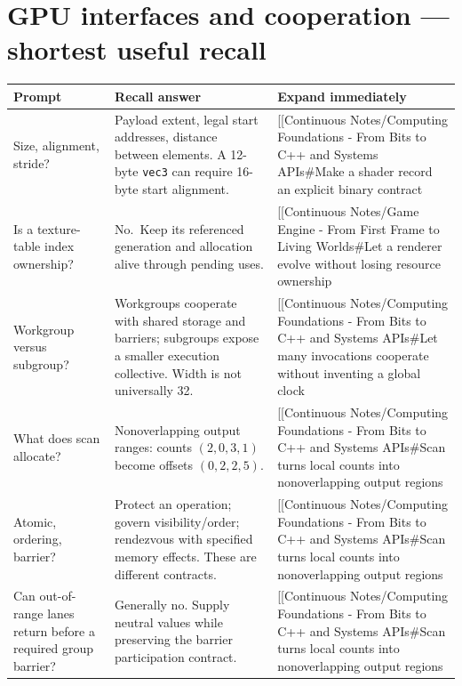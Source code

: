 \section{GPU interfaces and cooperation --- shortest useful recall}\label{appendix-960160274237-gpu-interfaces-and-cooperation-shortest-useful-recall}

{\def\LTcaptype{none} %
\begin{longtable}[]{@{}
  >{\raggedright\arraybackslash}p{}
  >{\raggedright\arraybackslash}p{}
  >{\raggedright\arraybackslash}p{}@{}}
\toprule\noalign{}
\begin{minipage}[b]{\linewidth}\raggedright
Prompt
\end{minipage} & \begin{minipage}[b]{\linewidth}\raggedright
Recall answer
\end{minipage} & \begin{minipage}[b]{\linewidth}\raggedright
Expand immediately
\end{minipage} \\
\midrule\noalign{}
\endhead
\bottomrule\noalign{}
\endlastfoot
Size, alignment, stride? & Payload extent, legal start addresses, distance between elements. A 12-byte \texttt{vec3} can require 16-byte start alignment. & {[}{[}Continuous Notes/Computing Foundations - From Bits to C++ and Systems APIs\#Make a shader record an explicit binary contract \\
Is a texture-table index ownership? & No.~Keep its referenced generation and allocation alive through pending uses. & {[}{[}Continuous Notes/Game Engine - From First Frame to Living Worlds\#Let a renderer evolve without losing resource ownership \\
Workgroup versus subgroup? & Workgroups cooperate with shared storage and barriers; subgroups expose a smaller execution collective. Width is not universally 32. & {[}{[}Continuous Notes/Computing Foundations - From Bits to C++ and Systems APIs\#Let many invocations cooperate without inventing a global clock \\
What does scan allocate? & Nonoverlapping output ranges: counts \((2,0,3,1)\) become offsets \((0,2,2,5)\). & {[}{[}Continuous Notes/Computing Foundations - From Bits to C++ and Systems APIs\#Scan turns local counts into nonoverlapping output regions \\
Atomic, ordering, barrier? & Protect an operation; govern visibility/order; rendezvous with specified memory effects. These are different contracts. & {[}{[}Continuous Notes/Computing Foundations - From Bits to C++ and Systems APIs\#Scan turns local counts into nonoverlapping output regions \\
Can out-of-range lanes return before a required group barrier? & Generally no. Supply neutral values while preserving the barrier participation contract. & {[}{[}Continuous Notes/Computing Foundations - From Bits to C++ and Systems APIs\#Scan turns local counts into nonoverlapping output regions \\
\end{longtable}
}

